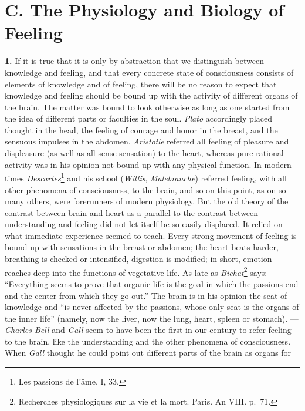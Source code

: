 \documentclass[12pt,a4paper]{book}
\newcommand{\opage}[1]{\marginnote{\footnotesize\textit{[#1]}}}
\begin{document}
\section*{C. The Physiology and Biology of Feeling}

\textbf{1.} If it is true that it is only by abstraction that we
distinguish between knowledge and feeling, and that every concrete state
of consciousness consists of elements of knowledge and of feeling, there
will be no reason to expect that knowledge and feeling should be bound
up with the activity of different organs of the brain. The matter was
bound to look otherwise as long as one started from the idea of
different parts or faculties in the soul. \emph{Plato} accordingly
placed thought in the head, the feeling of courage and honor in the
breast, and the sensuous impulses in the abdomen. \emph{Aristotle}
referred all feeling of pleasure and displeasure (as well as all
sense-sensation) to the heart, whereas pure rational activity was in his
opinion not bound up with any physical function. In modern times
\emph{Descartes}\footnote{Les passions de l’âme. I, 33.} and his school
(\emph{Willis}, \emph{Malebranche}) referred feeling, with all other
phenomena of consciousness, to the brain, and so on this point, as on so
many others, were forerunners of modern physiology. But the old theory
of the contrast between brain and heart as
\opage{319}a parallel to the contrast between understanding and feeling
did not let itself be so easily displaced. It relied on what immediate
experience seemed to teach. Every strong movement of feeling is bound up
with sensations in the breast or abdomen; the heart beats harder,
breathing is checked or intensified, digestion is modified; in short,
emotion reaches deep into the functions of vegetative life. As late as
\emph{Bichat}\footnote{Recherches physiologiques sur la vie et la
mort. Paris. An VIII. p.~71.} says: ``Everything seems to prove that
organic life is the goal in which the passions end and the center from
which they go out.'' The brain is in his opinion the seat of knowledge
and ``is never affected by the passions, whose only seat is the organs
of the inner life'' (namely, now the liver, now the lung, heart, spleen
or stomach). --- \emph{Charles Bell} and \emph{Gall} seem to have been
the first in our century to refer feeling to the brain, like the
understanding and the other phenomena of consciousness. When \emph{Gall}
thought he could point out different parts of the brain as organs for
\end{document}
